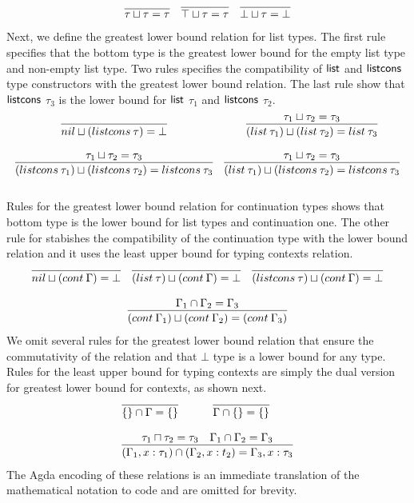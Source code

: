 \documentclass[review]{elsarticle}
\theoremstyle{definition}
\newcommand{\Con}[1]{\red{\mathsf{#1}}}
\begin{document}
\[
\begin{array}{ccc}
  \infer{\tau \sqcup \tau = \tau}{} & \infer{\top \sqcup \tau = \tau}{} & \infer{\bot \sqcup \tau = \bot}{}\\
\end{array}
\]
Next, we define the greatest lower bound relation for list types. The first rule specifies that the bottom
type is the greatest lower bound for the empty list type and non-empty list type. Two rules specifies the
compatibility of \ensuremath{\Con{list}} and \ensuremath{\Con{listcons}} type constructors with the greatest lower bound relation. The last
rule show that \ensuremath{\Con{listcons}} $\tau_3$ is the lower bound for \ensuremath{\Con{list}} $\tau_1$ and \ensuremath{\Con{listcons}} $\tau_2$.
\[
\begin{array}{cc}
  \infer{nil \sqcup (listcons\: \tau) = \bot}{} &
  \infer{(list\: \tau_1)\sqcup (list\:\tau_2) = list\:\tau_3}{\tau_1\sqcup \tau_2 = \tau_3} \\ & \\
   \infer{(listcons\: \tau_1)\sqcup (listcons\:\tau_2) = listcons\:\tau_3}{\tau_1\sqcup \tau_2 = \tau_3} &
  \infer{(list\: \tau_1)\sqcup (listcons\:\tau_2) = listcons\:\tau_3}{\tau_1\sqcup \tau_2 = \tau_3} \\ & \\
\end{array}
\]
Rules for the greatest lower bound relation for continuation types shows that bottom type is the
lower bound for list types and continuation one. The other rule for stabishes the compatibility of
the continuation type with the lower bound relation and it uses the least upper bound for typing
contexts relation.
\[
\begin{array}{ccc}
  \infer{nil\sqcup(cont\:\Gamma) = \bot}{} &
  \infer{(list\:\tau)\sqcup(cont\:\Gamma) = \bot}{} &
  \infer{(listcons\:\tau)\sqcup(cont\:\Gamma) = \bot}{} \\ & & \\
  \multicolumn{3}{c}{
    \infer{(cont\:\Gamma_1)\sqcup(cont\:\Gamma_2) = (cont\:\Gamma_3)}{\Gamma_1\cap\Gamma_2 = \Gamma_3}
  }
\end{array}
\]
We omit several rules for the greatest lower bound relation that ensure the commutativity of the
relation and that $\bot$ type is a lower bound for any type. Rules for the least upper bound for
typing contexts are simply the dual version for greatest lower bound for contexts, as shown next.
\[
  \begin{array}{cc}
    \infer{\{\} \cap \Gamma = \{\}}{} &
    \infer{\Gamma \cap \{\} = \{\}}{} \\ & \\
    \multicolumn{2}{c}{
      \infer{(\Gamma_1 , x : \tau_1) \cap (\Gamma_2 , x : t_2) = \Gamma_3, x : \tau_3}
            {\tau_1 \sqcap \tau_2 = \tau_3 & \Gamma_1 \cap \Gamma_2 = \Gamma_3}
    }
  \end{array}
\]
The Agda encoding of these relations is an immediate translation of the mathematical notation
to code and are omitted for brevity.
\end{document}
